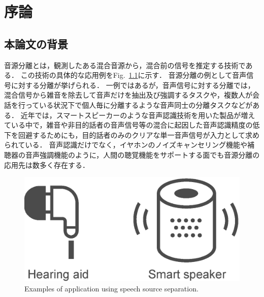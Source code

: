 \chapter{序論}
\label{chap:intro}

\section{本論文の背景}

音源分離とは，観測したある混合音源から，混合前の信号を推定する技術である．
この技術の具体的な応用例をFig.~\ref{fig:apps}に示す．
音源分離の例として音声信号に対する分離が挙げられる．
一例ではあるが，音声信号に対する分離では，混合信号から雑音を除去して音声だけを抽出及び強調するタスクや，複数人が会話を行っている状況下で個人毎に分離するような音声同士の分離タスクなどがある．
近年では，スマートスピーカーのような音声認識技術を用いた製品が増えている中で，雑音や非目的話者の音声信号等の混合に起因した音声認識精度の低下を回避するためにも，目的話者のみのクリアな単一音声信号が入力として求められている．
音声認識だけでなく，イヤホンのノイズキャンセリング機能や補聴器の音声強調機能のように，人間の聴覚機能をサポートする面でも音源分離の応用先は数多く存在する．
\begin{figure}[t]
    \vspace{4pt}
    \begin{center}
        \includegraphics[width=0.7\columnwidth]{figures/BSS_app.eps}
    \end{center}
    \vspace{-8pt}
	\caption{Examples of application using speech source separation.}
	\label{fig:apps}
\end{figure}

